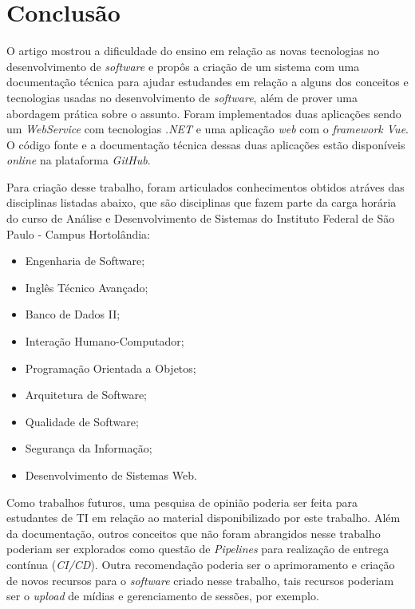 \documentclass[12pt]{article}
\begin{document}
\section{Conclusão}\label{Conclusao}

O artigo mostrou a dificuldade do ensino em relação as novas tecnologias no desenvolvimento de \textit{software}
e propôs a criação de um sistema com uma documentação técnica para ajudar estudandes em relação a alguns dos
conceitos e tecnologias usadas no desenvolvimento de \textit{software}, além de prover uma abordagem prática
sobre o assunto. Foram implementados duas aplicações sendo um \textit{WebService} com tecnologias \textit{.NET} e
uma aplicação \textit{web} com o \textit{framework Vue}. O código fonte e a documentação técnica dessas duas aplicações
estão disponíveis \textit{online} na plataforma \textit{GitHub}.

Para criação desse trabalho, foram articulados conhecimentos obtidos atráves das disciplinas listadas abaixo, que
são disciplinas que fazem parte da carga horária do curso de Análise e Desenvolvimento de Sistemas do Instituto
Federal de São Paulo - Campus Hortolândia:

\begin{itemize}
  \item Engenharia de Software;
  \item Inglês Técnico Avançado;
  \item Banco de Dados II;
  \item Interação Humano-Computador;
  \item Programação Orientada a Objetos;
  \item Arquitetura de Software;
  \item Qualidade de Software;
  \item Segurança da Informação;
  \item Desenvolvimento de Sistemas Web.
\end{itemize}

Como trabalhos futuros, uma pesquisa de opinião poderia ser feita para estudantes de TI em relação ao material
disponibilizado por este trabalho. Além da documentação, outros conceitos que não foram abrangidos nesse trabalho poderiam
ser explorados como questão de \textit{Pipelines} para realização de entrega contínua (\textit{CI/CD}).
Outra recomendação poderia ser o aprimoramento e criação de novos recursos para o \textit{software} criado nesse trabalho, tais recursos
poderiam ser o \textit{upload} de mídias e gerenciamento de sessões, por exemplo.



\end{document}
